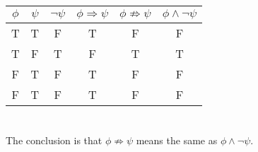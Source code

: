 \documentclass{article}
\begin{document}
\begin{tabular}{ | c | c | c | c | c | c | }
  \hline
  $\phi$ & $\psi$ & $\neg \psi$ & $\phi \Rightarrow \psi$ & $\phi \not \Rightarrow \psi$ & $\phi \wedge \neg \psi$ \\
  \hline
  T & T & F & T & F & F \\
  T & F & T & F & T & T \\
  F & T & F & T & F & F \\
  F & T & F & T & F & F \\
  \hline
\end{tabular}

\section{}

The conclusion is that $\phi \not \Rightarrow \psi$  means the same as $\phi \wedge \neg \psi$.
\end{document}
